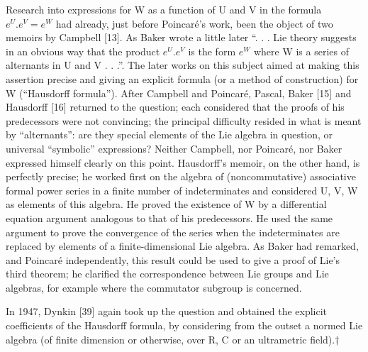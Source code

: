 Research into expressions for W as a function of U and V in the formula \(e^{U}.e^{V}=e^{W}\) had already, just before Poincaré's work, been the object of two memoirs by Campbell {[}13{]}. As Baker wrote a little later ``. . . Lie theory suggests in an obvious way that the product \(e^{U}.e^{V}\) is the form \(e^{W}\) where W is a series of alternants in U and V . . .''. The later works on this subject aimed at making this assertion precise and giving an explicit formula (or a method of construction) for W (``Hausdorff formula''). After Campbell and Poincaré, Pascal, Baker {[}15{]} and Hausdorff {[}16{]} returned to the question; each considered that the proofs of his predecessors were not convincing; the principal difficulty resided in what is meant by ``alternants'': are they special elements of the Lie algebra in question, or universal ``symbolic'' expressions? Neither Campbell, nor Poincaré, nor Baker expressed himself clearly on this point. Hausdorff's memoir, on the other hand, is perfectly precise; he worked first on the algebra of (noncommutative) associative formal power series in a finite number of indeterminates and considered U, V, W as elements of this algebra. He proved the existence of W by a differential equation argument analogous to that of his predecessors. He used the same argument to prove the convergence of the series when the indeterminates are replaced by elements of a finite-dimensional Lie algebra. As Baker had remarked, and Poincaré independently, this result could be used to give a proof of Lie's third theorem; he clarified the correspondence between Lie groups and Lie algebras, for example where the commutator subgroup is concerned.

In 1947, Dynkin {[}39{]} again took up the question and obtained the explicit coefficients of the Hausdorff formula, by considering from the outset a normed Lie algebra (of finite dimension or otherwise, over R, C or an ultrametric field).†

